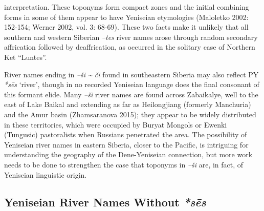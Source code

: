 interpretation. These toponyms form compact zones and the initial combining forms in some of them appear to have Yeniseian etymologies (Maloletko 2002: 152-154; Werner 2002, vol. 3: 68-69). These two facts make it unlikely that all southern and western Siberian \textit{–tes }river names arose through random secondary affrication followed by deaffrication, as occurred in the solitary case of Northern Ket “Luntes”.

River names ending in \textit{–ši \~{} či} found in southeastern Siberia may also reflect PY \textit{*s\=es} ‘river’, though in no recorded Yeniseian language does the final consonant of this formant elide. Many \textit{–ši }river names are found across Zabaikalye, well to the east of Lake Baikal and extending as far as Heilongjiang (formerly Manchuria) and the Amur basin (Zhamsaranova 2015); they appear to be widely distributed in these territories, which were occupied by Buryat Mongols or Ewenki (Tungusic) pastoralists when Russians penetrated the area. The possibility of Yeniseian river names in eastern Siberia, closer to the Pacific, is intriguing for understanding the geography of the Dene-Yeniseian connection, but more work needs to be done to strengthen the case that toponyms in \textit{–ši} are, in fact, of Yeniseian linguistic origin.

\subsection{Yeniseian River Names Without \textit{*s\=es}}

